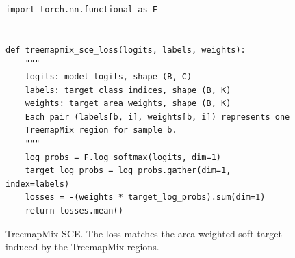 \begin{figure}[!htbp]
\centering
\footnotesize
\begin{verbatim}
import torch.nn.functional as F


def treemapmix_sce_loss(logits, labels, weights):
    """
    logits: model logits, shape (B, C)
    labels: target class indices, shape (B, K)
    weights: target area weights, shape (B, K)
    Each pair (labels[b, i], weights[b, i]) represents one
    TreemapMix region for sample b.
    """
    log_probs = F.log_softmax(logits, dim=1)
    target_log_probs = log_probs.gather(dim=1, index=labels)
    losses = -(weights * target_log_probs).sum(dim=1)
    return losses.mean()
\end{verbatim}
\caption{TreemapMix-SCE. The loss matches the area-weighted soft target induced by the TreemapMix regions.}
\label{fig:treemapmix-sce-code}
\end{figure}